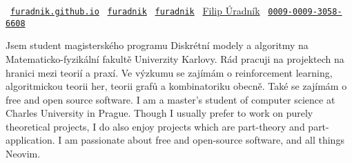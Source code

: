 \vspace{.2em}

\begin{center}
	\small
	\hspace{.5in}
	\faGlobe\ \texttt{\href{https://furadnik.github.io}{furadnik.github.io}}
	\hfill
	\faGithub\ \texttt{\href{https://github.com/furadnik}{furadnik}}                                                                      
	\hfill
	\faLinkedin\ \texttt{\href{https://www.linkedin.com/in/furadnik/}{furadnik}}
	\hfill
	\aiGoogleScholarSquare\ \href{https://scholar.google.com/citations?user=7AvTiqgAAAAJ}{Filip Úradník}
	\hfill
	\aiOrcid\ \texttt{\href{https://orcid.org/0009-0009-3058-6608}{0009-0009-3058-6608}}
	\hspace{.5in}

\end{center}

\begin{intro}
	\lng
	{
		Jsem student magisterského programu Diskrétní modely a algoritmy na Matematicko-fyzikální fakultě Univerzity Karlovy.
		Rád pracuji na projektech na hranici mezi teorií a praxí.
		Ve výzkumu se zajímám o reinforcement learning, algoritmickou teorii her, teorii grafů a kombinatoriku obecně.
		Také se zajímám o free and open source software.
	}{
		I am a master's student of computer science at Charles University in Prague.
		Though I usually prefer to work on purely theoretical projects, I do also enjoy projects which are part-theory and part-application.
		I am passionate about free and open-source software, and all things Neovim.
	}
\end{intro}


